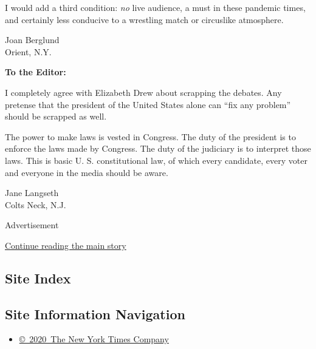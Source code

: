 I would add a third condition: \emph{no} live audience, a must in these
pandemic times, and certainly less conducive to a wrestling match or
circuslike atmosphere.

Joan Berglund\\
Orient, N.Y.

\textbf{To the Editor:}

I completely agree with Elizabeth Drew about scrapping the debates. Any
pretense that the president of the United States alone can ``fix any
problem'' should be scrapped as well.

The power to make laws is vested in Congress. The duty of the president
is to enforce the laws made by Congress. The duty of the judiciary is to
interpret those laws. This is basic U. S. constitutional law, of which
every candidate, every voter and everyone in the media should be aware.

Jane Langseth\\
Colts Neck, N.J.

Advertisement

\protect\hyperlink{after-bottom}{Continue reading the main story}

\hypertarget{site-index}{%
\subsection{Site Index}\label{site-index}}

\hypertarget{site-information-navigation}{%
\subsection{Site Information
Navigation}\label{site-information-navigation}}

\begin{itemize}
\tightlist
\item
  \href{https://help.nytimes.com/hc/en-us/articles/115014792127-Copyright-notice}{©~2020~The
  New York Times Company}
\end{itemize}

